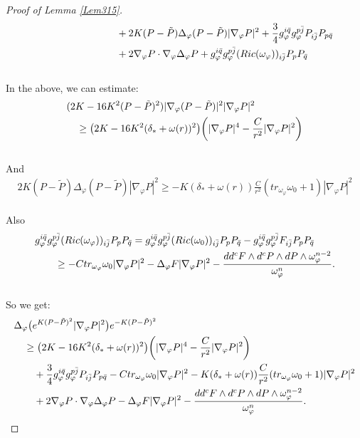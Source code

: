 \documentclass[11pt]{amsart}
\numberwithin{equation}{section}
\begin{document}
\begin{proof}[Proof of Lemma \ref{Lem315}]
\begin{align}
	&\qquad\qquad\qquad\qquad +2K(P-\tilde P)\Delta_{\varphi}(P-\tilde P)|\nabla_{\varphi}P|^2 +\frac{3}{4}g_{\varphi}^{i\bar{q}}g_{\varphi}^{p\bar{j}}P_{i\bar{j}}P_{p\bar{q}} \notag\\
	&\qquad\qquad\qquad\qquad +2\nabla_{\varphi}P\cdot \nabla_{\varphi}\Delta_{\varphi}P+g_{\varphi}^{i\bar{q}}g_{\varphi}^{p\bar{j}}(Ric(\omega_{\varphi}))_{i\bar{j}}P_pP_{\bar{q}} 
\end{align}\\
In the above,  we can estimate: 
\begin{align}
	&(2K-16K^2(P-\tilde P)^2)|\nabla_\varphi(P-\tilde P)|^2 |\nabla_{\varphi}P|^2 \notag\\
	&\quad  \ge  \big(2K-16K^2(\delta_*+\omega(r))^2 \big)\bigg( |\nabla_\varphi P|^4 -\frac{C}{r^2}|\nabla_\varphi P|^2 \bigg)
\end{align}\\
And
\begin{align}
	2K(P-\tilde P)\Delta_{\varphi}(P-\tilde P)|\nabla_{\varphi}P|^2\ge  -K(\delta_*+\omega(r)) \frac{C}{r^2} (tr_{\omega_{\varphi}}\omega_0+1)|\nabla_\varphi P|^2
\end{align}\\
Also
\begin{align}
	& g_{\varphi}^{i\bar{q}}g_{\varphi}^{p\bar{j}}(Ric(\omega_{\varphi}))_{i\bar{j}}P_pP_{\bar{q}} =g_{\varphi}^{i\bar{q}}g_{\varphi}^{p\bar{j}}(Ric(\omega_0))_{i\bar{j}}P_pP_{\bar{q}} - g_{\varphi}^{i\bar{q}}g_{\varphi}^{p\bar{j}}F_{i\bar{j}}P_pP_{\bar{q}} \notag \\
	&\qquad \ge  -C tr_{\omega_{\varphi}}\omega_0|\nabla_{\varphi}P|^2 - \Delta_{\varphi}F|\nabla_{\varphi}P|^2 - \frac{dd^cF\wedge d^c P\wedge d P\wedge \omega_{\varphi}^{n-2}}{\omega_{\varphi}^n}.
\end{align}\\
So we get:
\begin{align}
	&\Delta_{\varphi}\big(e^{K(P-\tilde P)^2}|\nabla_{\varphi}P|^2\big)e^{-K(P-\tilde P)^2}  \notag\\
	&\quad  \ge  \big(2K-16K^2(\delta_*+\omega(r))^2 \big)\bigg( |\nabla_\varphi P|^4 -\frac{C}{r^2}|\nabla_\varphi P|^2 \bigg)   \notag \\
	&\qquad +\frac{3}{4}g_{\varphi}^{i\bar{q}}g_{\varphi}^{p\bar{j}}P_{i\bar{j}}P_{p\bar{q}} -C tr_{\omega_{\varphi}}\omega_0|\nabla_{\varphi}P|^2 -K(\delta_*+\omega(r)) \frac{C}{r^2} (tr_{\omega_{\varphi}}\omega_0+1)|\nabla_\varphi P|^2 \notag\\
	&\qquad +2\nabla_{\varphi}P\cdot \nabla_{\varphi}\Delta_{\varphi}P - \Delta_{\varphi}F|\nabla_{\varphi}P|^2 - \frac{dd^cF\wedge d^cP\wedge dP\wedge \omega_{\varphi}^{n-2}}{\omega_{\varphi}^n}.

\end{align}
\end{proof}
\end{document}
